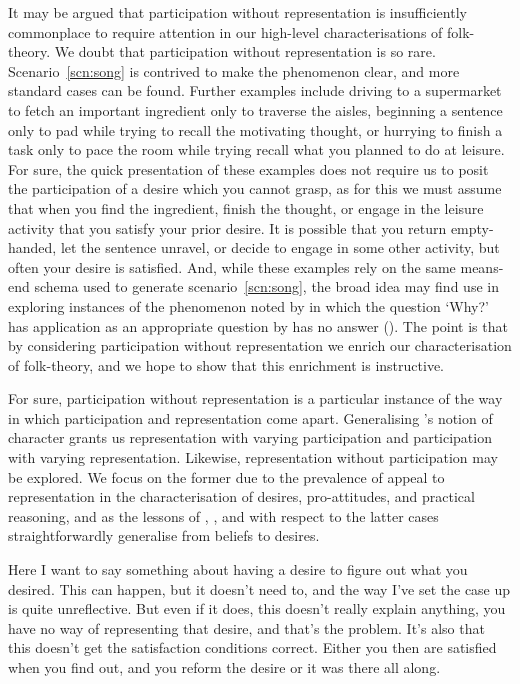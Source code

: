 \documentclass[10pt]{article}
\begin{document}
It may be argued that participation without representation is insufficiently commonplace to require attention in our high-level characterisations of folk-theory.
We doubt that participation without representation is so rare.
Scenario~\ref{scn:song} is contrived to make the phenomenon clear, and more standard cases can be found.
Further examples include driving to a supermarket to fetch an important ingredient only to traverse the aisles, beginning a sentence only to pad while trying to recall the motivating thought, or hurrying to finish a task only to pace the room while trying recall what you planned to do at leisure.
For sure, the quick presentation of these examples does not require us to posit the participation of a desire which you cannot grasp, as for this we must assume that when you find the ingredient, finish the thought, or engage in the leisure activity that you satisfy your prior desire.
It is possible that you return empty-handed, let the sentence unravel, or decide to engage in some other activity, but often your desire is satisfied.
And, while these examples rely on the same means-end schema used to generate scenario~\ref{scn:song}, the broad idea may find use in exploring instances of the phenomenon noted by \citeauthor{Anscombe:1957aa} in which the question `Why?' has application as an appropriate question by has no answer (\citeyear[--18]{Anscombe:1957aa}).
The point is that by considering participation without representation we enrich our characterisation of folk-theory, and we hope to show that this enrichment is instructive.

For sure, participation without representation is a particular instance of the way in which participation and representation come apart.
Generalising \citeauthor{Kaplan:1989aa}'s notion of character grants us representation with varying participation and participation with varying representation.
Likewise, representation without participation may be explored.
We focus on the former due to the prevalence of appeal to representation in the characterisation of desires, pro-attitudes, and practical reasoning, and as the lessons of \citeauthor{Kaplan:1989aa}, \citeauthor{Lewis:1979aa}, and \citeauthor{Perry:1993aa} with respect to the latter cases straightforwardly generalise from beliefs to desires.


{\color{red}
  Here I want to say something about having a desire to figure out what you desired.
  This can happen, but it doesn't need to, and the way I've set the case up is quite unreflective.
  But even if it does, this doesn't really explain anything, you have no way of representing that desire, and that's the problem.
  It's also that this doesn't get the satisfaction conditions correct.
  Either you then are satisfied when you find out, and you reform the desire or it was there all along.
}
\end{document}
